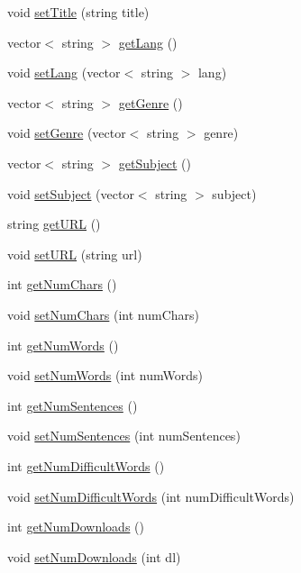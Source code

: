 \begin{DoxyCompactItemize}
void \hyperlink{classbridges_1_1_gutenberg_book_a5038252948e5f173dad4926c0970c5d3}{set\+Title} (string title)
\item 
vector$<$ string $>$ \hyperlink{classbridges_1_1_gutenberg_book_ac2eabdf4c650bc3720dcf5b030a59d0d}{get\+Lang} ()
\item 
void \hyperlink{classbridges_1_1_gutenberg_book_ab8cf27c1e496eb34d1e74e8343b4a466}{set\+Lang} (vector$<$ string $>$ lang)
\item 
vector$<$ string $>$ \hyperlink{classbridges_1_1_gutenberg_book_a7caa2af2fdd0af98e95ed4fad74efdd7}{get\+Genre} ()
\item 
void \hyperlink{classbridges_1_1_gutenberg_book_a2b81b6cf785ea9dfef0a1b1e15331b38}{set\+Genre} (vector$<$ string $>$ genre)
\item 
vector$<$ string $>$ \hyperlink{classbridges_1_1_gutenberg_book_aa005000e827d8b3dd208ab269906f8ed}{get\+Subject} ()
\item 
void \hyperlink{classbridges_1_1_gutenberg_book_aa640bef3156b13c8ca510e0a280b1c5f}{set\+Subject} (vector$<$ string $>$ subject)
\item 
string \hyperlink{classbridges_1_1_gutenberg_book_a1456d456f75c689b06d80b7e2d0f46e3}{get\+U\+R\+L} ()
\item 
void \hyperlink{classbridges_1_1_gutenberg_book_a4a5fa52c405170b57535cd0fcde5e3cf}{set\+U\+R\+L} (string url)
\item 
int \hyperlink{classbridges_1_1_gutenberg_book_aa86b5c97b78ef0f745723a7245ee05f2}{get\+Num\+Chars} ()
\item 
void \hyperlink{classbridges_1_1_gutenberg_book_a65cb7af6360e56a684e0606593846780}{set\+Num\+Chars} (int num\+Chars)
\item 
int \hyperlink{classbridges_1_1_gutenberg_book_aadb4dc37374a7b3be6b7b4def4726d5b}{get\+Num\+Words} ()
\item 
void \hyperlink{classbridges_1_1_gutenberg_book_a34dafee1fb976f1da102d40f33a08ecf}{set\+Num\+Words} (int num\+Words)
\item 
int \hyperlink{classbridges_1_1_gutenberg_book_a059066390328e09949ea5fdb456a5c43}{get\+Num\+Sentences} ()
\item 
void \hyperlink{classbridges_1_1_gutenberg_book_a368e71eaea48375104f172e0ae17527d}{set\+Num\+Sentences} (int num\+Sentences)
\item 
int \hyperlink{classbridges_1_1_gutenberg_book_a26f18a0274a7cebd495f3e438e9a037f}{get\+Num\+Difficult\+Words} ()
\item 
void \hyperlink{classbridges_1_1_gutenberg_book_a4397cd3b9fd6113a1e72eb7671dd9d87}{set\+Num\+Difficult\+Words} (int num\+Difficult\+Words)
\item 
int \hyperlink{classbridges_1_1_gutenberg_book_a9d11f90ed3928c075534f3712e00f011}{get\+Num\+Downloads} ()
\item 
void \hyperlink{classbridges_1_1_gutenberg_book_a6846dba9a5a78f360a0483b8685d79c1}{set\+Num\+Downloads} (int dl)
\end{DoxyCompactItemize}


